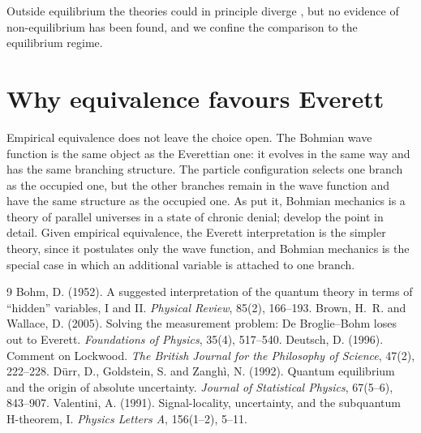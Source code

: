 \documentclass{situationist-preprint}
\begin{document}
Outside equilibrium the theories could in principle diverge \citep{Valentini1991}, but no evidence of non-equilibrium has been found, and we confine the comparison to the equilibrium regime.

\section{Why equivalence favours Everett}

Empirical equivalence does not leave the choice open. The Bohmian wave function is the same object as the Everettian one: it evolves in the same way and has the same branching structure. The particle configuration selects one branch as the occupied one, but the other branches remain in the wave function and have the same structure as the occupied one. As \citet{Deutsch1996} put it, Bohmian mechanics is a theory of parallel universes in a state of chronic denial; \citet{BrownWallace2005} develop the point in detail. Given empirical equivalence, the Everett interpretation is the simpler theory, since it postulates only the wave function, and Bohmian mechanics is the special case in which an additional variable is attached to one branch.

\begin{thebibliography}{9}\small
{} Bohm, D. (1952). A suggested interpretation of the quantum theory in terms of ``hidden'' variables, I and II. \emph{Physical Review}, 85(2), 166--193.
 Brown, H.~R. and Wallace, D. (2005). Solving the measurement problem: De Broglie--Bohm loses out to Everett. \emph{Foundations of Physics}, 35(4), 517--540.
 Deutsch, D. (1996). Comment on Lockwood. \emph{The British Journal for the Philosophy of Science}, 47(2), 222--228.
 Dürr, D., Goldstein, S. and Zanghì, N. (1992). Quantum equilibrium and the origin of absolute uncertainty. \emph{Journal of Statistical Physics}, 67(5--6), 843--907.
 Valentini, A. (1991). Signal-locality, uncertainty, and the subquantum H-theorem, I. \emph{Physics Letters A}, 156(1--2), 5--11.
\end{thebibliography}
\end{document}
